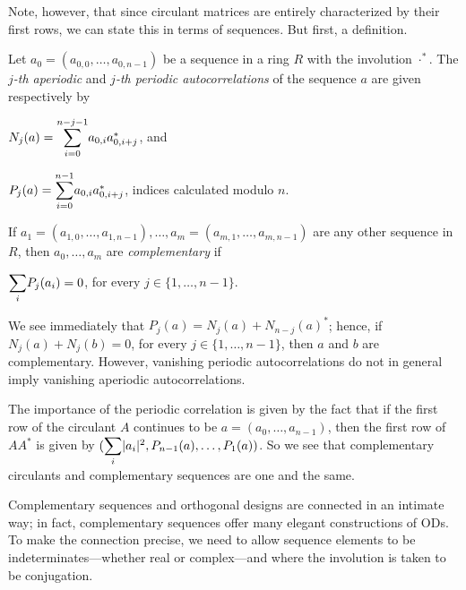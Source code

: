 \documentclass[../../../main]{subfiles}
\begin{document}
 Note, however, that since circulant matrices are entirely characterized by
 their first rows, we can state this in terms of sequences. But first, a definition.
 
 \begin{defin}
  Let $a_0=(a_{0,0}, \dots, a_{0,n-1})$ be a sequence in a ring $R$ with the involution $\cdot^*$. The {\it $j$-th aperiodic} and {\it $j$-th periodic autocorrelations} of the sequence $a$ are given respectively by
  \begin{defenum}
   \item $N_j(a)=\ssum_{i=0}^{n-j-1}a_{0,i}a_{0,i+j}^*$, and
   \item $P_j(a)=\ssum_{i=0}^{n-1}a_{0,i}a_{0,i+j}^*$, indices calculated modulo $n$.
  \end{defenum}
  If $a_1=(a_{1,0},\dots,a_{1,n-1}),\dots,a_m=(a_{m,1},\dots,a_{m,n-1})$ are any other sequence in $R$, then $a_0,\dots,a_m$ are {\it complementary} if
  \begin{defenum}[resume]
   \item\label{periodic-comp} $\ssum_i P_j(a_i)=0$, for every $j \in \{1, \dots, n-1\}$.
  \end{defenum}
 \end{defin}
 
 We see immediately that $P_j(a)=N_j(a) + N_{n-j}(a)^*$; hence, if $N_j(a)+N_j(b)=0$, for every $j \in \{1,\dots,n-1\}$, then $a$ and $b$ are complementary. However, vanishing periodic autocorrelations do not in general imply vanishing aperiodic autocorrelations.
 
 The importance of the periodic correlation is given by the fact that if the first row of the circulant $A$ continues to be $a=(a_0,\dots,a_{n-1})$, then the first row of $AA^*$ is given by $(\ssum_i|a_i|^2,P_{n-1}(a), \dots,P_1(a))$. So we see that complementary circulants and complementary sequences are one and the same.
 
 Complementary sequences and orthogonal designs are connected in an intimate
 way; in fact, complementary sequences offer many elegant constructions of ODs.
 To make the connection precise, we need to allow sequence elements to be
 indeterminates---whether real or complex---and where the
 involution is taken to be conjugation. 
 
\end{document}
